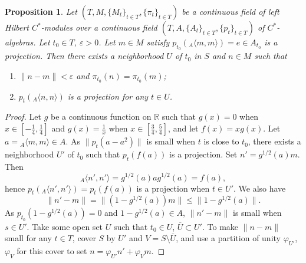 \documentclass[12pt]{amsart}
\newtheorem{prop}[thm]{Proposition}
\theoremstyle{definition}
\newcommand{\e}{\varepsilon}
\begin{document}
\begin{prop}\label{prop1}
Let $(T,M,\{M_t\}_{t\in T},\{\pi_t\}_{t\in T})$ be a continuous field of left Hilbert $C^*$-modules over a continuous field $(T,A,\{A_t\}_{t\in T},\{p_t\}_{t\in T})$ of $C^*$-algebras. Let $t_0\in T$, $\e>0$. Let $m\in M$ satisfy $p_{t_0}({}_A\langle m,m\rangle)=e\in A_{t_0}$ is a projection. Then there exists a neighborhood $U$ of $t_0$ in $S$ and $n\in M$ such that 
\begin{enumerate}
\item
$\|n-m\|<\e$ and $\pi_{t_0}(n)=\pi_{t_0}(m)$;
\item
$p_t({}_A\langle n,n\rangle)$ is a projection for any $t\in U$.

\end{enumerate}

\end{prop}
\begin{proof}
Let $g$ be a continuous function on $\mathbb R$ such that $g(x)=0$ when $x\in[-\frac{1}{4},\frac{1}{4}]$ and $g(x)=\frac{1}{x}$ when $x\in[\frac{3}{4},\frac{5}{4}]$, and let $f(x)=xg(x)$. Let $a={}_A\langle m,m\rangle\in A$. As $\|p_t(a-a^2)\|$ is small when $t$ is close to $t_0$, there exists a neighborhood $U'$ of $t_0$ such that $p_t(f(a))$ is a projection. Set $n'=g^{1/2}(a)m$. Then 
$$
{}_A\langle n',n'\rangle=g^{1/2}(a)ag^{1/2}(a)=f(a), 
$$
hence $p_t({}_A\langle n',n'\rangle)=p_t(f(a))$ is a projection when $t\in U'$. We also have 
$$
\|n'-m\|=\|(1-g^{1/2}(a))m\|\leq \|1-g^{1/2}(a)\|. 
$$
As $p_{t_0}(1-g^{1/2}(a))=0$ and $1-g^{1/2}(a)\in A$, $\|n'-m\|$ is small when $s\in U'$. Take some open set $U$ such that $t_0\in U$, $\overline{U}\subset U'$. To make $\|n-m\|$ small for any $t\in T$, cover $S$ by $U'$ and $V=S\setminus\overline{U}$, and use a partition of unity $\varphi_{U'}$, $\varphi_V$ for this cover to set $n=\varphi_{U'} n'+\varphi_V m$.
\end{proof}
\end{document}
